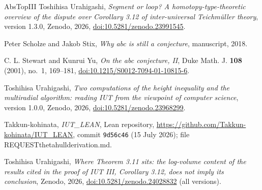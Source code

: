 \documentclass[11pt,a4paper]{article}
\numberwithin{table}{section}
\newcommand{\leanus}{\textunderscore\allowbreak}
\newcommand{\lean}[1]{{\ttfamily\let\_\leanus #1}}
\theoremstyle{plain}
\theoremstyle{definition}
\begin{document}
\begin{thebibliography}{AbsTopIII}
Toshihisa Urahigashi, \emph{Segment or loop? A homotopy-type-theoretic overview of the dispute over Corollary 3.12 of
inter-universal {T}eichm\"uller theory}, version 1.3.0, Zenodo, 2026,
\href{https://doi.org/10.5281/zenodo.23991545}{doi:10.5281/zenodo.23991545}.

Peter Scholze and Jakob Stix, \emph{Why abc is still a conjecture}, manuscript, 2018.

C. L. Stewart and Kunrui Yu, \emph{On the abc conjecture, {II}}, Duke Math. J. \textbf{108} (2001), no.~1, 169--181,
\href{https://doi.org/10.1215/S0012-7094-01-10815-6}{doi:10.1215/S0012-7094-01-10815-6}.

Toshihisa Urahigashi, \emph{Two computations of the height inequality and the multiradial algorithm: reading IUT from
the viewpoint of computer science}, version 1.0.0, Zenodo, 2026,
\href{https://doi.org/10.5281/zenodo.23968299}{doi:10.5281/zenodo.23968299}.

Takkun-kohinata, \emph{IUT\_LEAN}, Lean repository, \url{https://github.com/Takkun-kohinata/IUT_LEAN}, commit
\texttt{9d56c46} (15 July 2026); file \lean{REQUEST\_theta\_hull\_derivation.md}.

Toshihisa Urahigashi, \emph{Where Theorem 3.11 sits: the log-volume content of the results cited in the proof of IUT
III, Corollary 3.12, does not imply its conclusion}, Zenodo, 2026,
\href{https://doi.org/10.5281/zenodo.24028832}{doi:10.5281/zenodo.24028832} (all versions).
\end{thebibliography}
\end{document}
